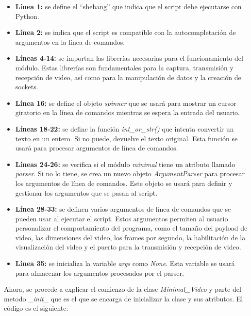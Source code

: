 \begin{itemize}
    \item \textbf{Línea 1:} se define el ``shebang'' que indica que el script debe ejecutarse con Python.
    \item \textbf{Línea 2:} se indica que el script es compatible con la autocompletación de argumentos en la línea de comandos.
    \item \textbf{Líneas 4-14:} se importan las librerías necesarias para el funcionamiento del módulo. Estas librerías son fundamentales para la captura, transmisión y recepción de video, así como para la manipulación de datos y la creación de sockets.
    \item \textbf{Línea 16:} se define el objeto \textit{spinner} que se usará para mostrar un cursor giratorio en la línea de comandos mientras se espera la entrada del usuario.
    \item \textbf{Líneas 18-22:} se define la función \textit{int\_or\_str()} que intenta convertir un texto en un entero. Si no puede, devuelve el texto original. Esta función se usará para procesar argumentos de línea de comandos.
    \item \textbf{Líneas 24-26:} se verifica si el módulo \textit{minimal} tiene un atributo llamado \textit{parser}. Si no lo tiene, se crea un nuevo objeto \textit{ArgumentParser} para procesar los argumentos de línea de comandos. Este objeto se usará para definir y gestionar los argumentos que se pasan al script.
    \item \textbf{Línea 28-33:} se definen varios argumentos de línea de comandos que se pueden usar al ejecutar el script. Estos argumentos permiten al usuario personalizar el comportamiento del programa, como el tamaño del payload de video, las dimensiones del video, los frames por segundo, la habilitación de la visualización del video y el puerto para la transmisión y recepción de video.
    \item \textbf{Línea 35:} se inicializa la variable \textit{args} como \textit{None}. Esta variable se usará para almacenar los argumentos procesados por el parser.
\end{itemize}

\vspace{\baselineskip}

Ahora, se procede a explicar el comienzo de la clase \textit{Minimal\_Video} y parte del metodo \textit{\_init\_} que es el que se encarga de inicializar la clase y sus atributos. El código es el siguiente:

